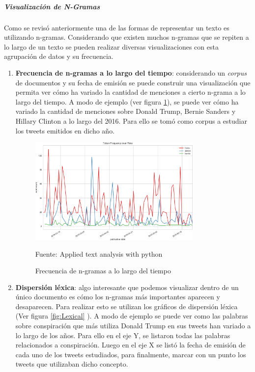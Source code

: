 \subparagraph{Visualización de N-Gramas}
\subparagraph*{}
    Como se revisó anteriormente una de las formas de representar un texto es utilizando n-gramas. Considerando que existen muchos n-gramas que se repiten a lo largo de un texto se pueden realizar diversas visualizaciones con esta agrupación de datos y su frecuencia.
\begin{enumerate}
    \item \textbf{Frecuencia de n-gramas a lo largo del tiempo}:
        considerando un \textit{corpus} de documentos y su fecha de emisión se puede construir una visualización que permita ver cómo ha variado la cantidad de menciones a cierto n-grama a lo largo del tiempo. A modo de ejemplo (ver figura \ref{fig:NgramasTiempo}), se puede ver cómo ha variado la cantidad de menciones sobre Donald Trump, Bernie Sanders y Hillary Clinton a lo largo del 2016. Para ello se tomó como corpus a estudiar los tweets emitidos en dicho año.
    \begin{figure}[H]
        \centering
        \includegraphics[width=0.8\textwidth]{figures/Frecuencia_sobre_tiempo.png}
        \caption{\label{fig:NgramasTiempo} Frecuencia de n-gramas a lo largo del tiempo} Fuente: Applied text analysis with python \cite{bengfort2018applied}
    \end{figure}
    \item \textbf{Dispersión léxica}: algo interesante que podemos visualizar dentro de un único documento es cómo los n-gramas más importantes aparecen y desaparecen. Para realizar esto se utilizan los gráficos de dispersión léxica (Ver figura \ref{fig:Lexical} ). A modo de ejemplo se puede ver como las palabras sobre conspiración que más utiliza Donald Trump en sus tweets han variado a lo largo de los años. Para ello en el eje Y, se listaron todas las palabras relacionados a conspiración. Luego en el eje X se listó la fecha de emisión de cada uno de los tweets estudiados, para finalmente, marcar con un punto los tweets que utilizaban dicho concepto.

\end{enumerate}
